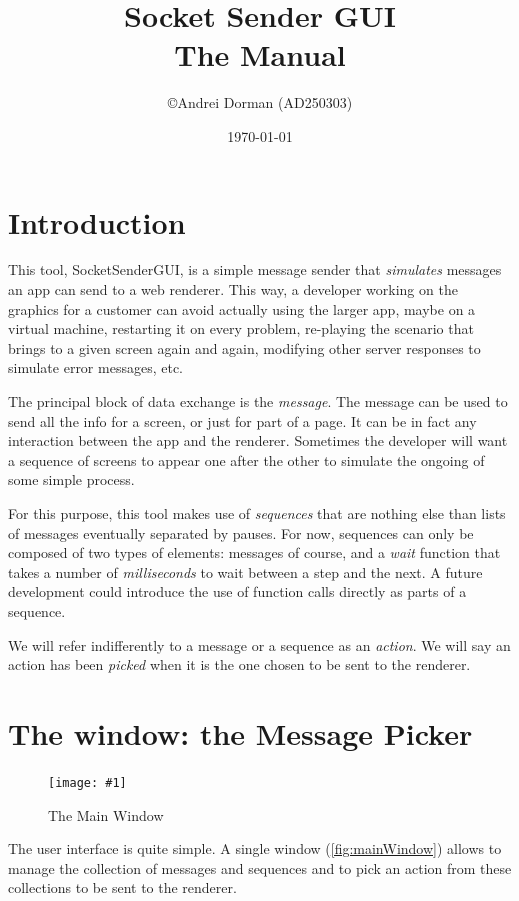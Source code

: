 \documentclass[11pt]{refart}
\title{Socket Sender GUI\\The Manual}
\author{\copyright Andrei Dorman (AD250303)}
\date{\today}
\newenvironment{fullfigure}[1][ht]
{%
\begin{figure}[#1]%
  	\hspace*{-\leftmarginwidth}%
  	\begin{minipage}{\fullwidth}%
}%
{%
	\end{minipage}%
\end{figure}%
}
\newcommand{\fullscreenshot}[3]{%
	\begin{fullfigure}[ht]%
  		\texttt{[image: \#1]}%
  		\caption{#2}%
  		\label{#3}%
	\end{fullfigure}%
}
\newcommand*{\socketsender}{SocketSenderGUI\xspace}
\begin{document}
\maketitle
\vfill
\tableofcontents

\pagebreak

\null
\vfill
\section{Introduction}

This tool, \socketsender, is a simple message sender that \emph{simulates} messages an app can send to a web renderer.
This way, a developer working on the graphics for a customer can avoid actually using the larger app, maybe on a virtual machine, restarting it on every problem, re-playing the scenario that brings to a given screen again and again, modifying other server responses to simulate error messages, etc. 

The principal block of data exchange is the \emph{message}. 
The message can be used to send all the info for a screen, or just for part of a page.
It can be in fact any interaction between the app and the renderer.
Sometimes the developer will want a sequence of screens to appear one after the other to simulate the ongoing of some simple process. 

For this purpose, this tool makes use of \emph{sequences} that are nothing else than lists of messages eventually separated by pauses.
For now, sequences can only be composed of two types of elements: messages of course, and a \emph{wait} function that takes a number of \emph{milliseconds} to wait between a step and the next.
A future development could introduce the use of function calls directly as parts of a sequence.

We will refer indifferently to a message or a sequence as an \emph{action}. 
We will say an action has been \emph{picked} when it is the one chosen to be sent to the renderer.

\pagebreak
\section{The window: the Message Picker}

\fullscreenshot{../screenshots/01_MainWindow.png}{The Main Window}{fig:mainWindow}

The user interface is quite simple.
A single window (\autoref{fig:mainWindow}) allows to manage the collection of messages and sequences and to pick an action from these collections to be sent to the renderer.
\end{document}
